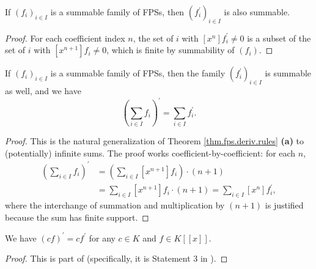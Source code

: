 \begin{lemma}
\label{lem.fps.deriv.summable-preserved}
\leanhelper
\leanok
If $(f_i)_{i\in I}$ is a summable family of FPSs, then
$(f_i^{\prime})_{i\in I}$ is also summable.
\end{lemma}

\begin{proof}
\leanok
For each coefficient index $n$, the set of $i$ with $[x^n]f_i^{\prime} \neq 0$
is a subset of the set of $i$ with $[x^{n+1}]f_i \neq 0$, which is finite
by summability of $(f_i)$.
\end{proof}

\begin{lemma}
\label{lem.fps.deriv.rules.b.infinite}
\leanhelper
\leanok
If $\left(  f_{i}\right)  _{i\in I}$ is a summable family of
FPSs, then the family $\left(  f_{i}^{\prime}\right)  _{i\in I}$ is summable
as well, and we have%
\[
\left(  \sum_{i\in I}f_{i}\right)  ^{\prime}=\sum_{i\in I}f_{i}^{\prime}.
\]
\end{lemma}

\begin{proof}
This is the natural generalization of Theorem
\ref{thm.fps.deriv.rules} \textbf{(a)} to (potentially) infinite sums. The
proof works coefficient-by-coefficient: for each $n$,
\begin{align*}
[x^n]\left(\sum_{i\in I}f_i\right)^{\prime}
&= \left(\sum_{i\in I}[x^{n+1}]f_i\right) \cdot (n+1) \\
&= \sum_{i\in I} [x^{n+1}]f_i \cdot (n+1)
= \sum_{i\in I} [x^n] f_i^{\prime},
\end{align*}
where the interchange of summation and multiplication by $(n+1)$ is justified
because the sum has finite support.
\end{proof}

\begin{lemma}
\label{lem.fps.deriv.rules.c}
\leanhelper
\leanok
We have $\left(  cf\right)  ^{\prime}=cf^{\prime}$ for any $c\in
K$ and $f\in K\left[  \left[  x\right]  \right]  $.
\end{lemma}

\begin{proof}
\leanok
This is part of \cite[Exercise 5 \textbf{(b)}]{19s-mt3s}
(specifically, it is Statement 3 in \cite[solution to Exercise 5 \textbf{(b)}%
]{19s-mt3s}).
\end{proof}

